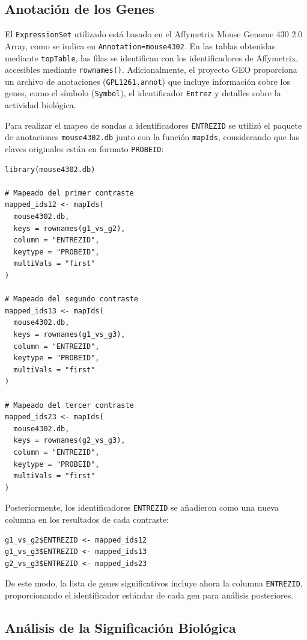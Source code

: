 \documentclass[12pt,a4paper]{article}
\begin{document}
\subsection{Anotación de los Genes}

El \texttt{ExpressionSet} utilizado está basado en el Affymetrix Mouse Genome 430 2.0 Array, como se indica en \texttt{Annotation=mouse4302}. En las tablas obtenidas mediante \texttt{topTable}, las filas se identifican con los identificadores de Affymetrix, accesibles mediante \texttt{rownames()}. Adicionalmente, el proyecto GEO proporciona un archivo de anotaciones (\texttt{GPL1261.annot}) que incluye información sobre los genes, como el símbolo (\texttt{Symbol}), el identificador \texttt{Entrez} y detalles sobre la actividad biológica.

Para realizar el mapeo de sondas a identificadores \texttt{ENTREZID} se utilizó el paquete de anotaciones \texttt{mouse4302.db} junto con la función \texttt{mapIds}, considerando que las claves originales están en formato \texttt{PROBEID}:

\begin{verbatim}
library(mouse4302.db)

# Mapeado del primer contraste
mapped_ids12 <- mapIds(
  mouse4302.db,
  keys = rownames(g1_vs_g2),
  column = "ENTREZID", 
  keytype = "PROBEID",
  multiVals = "first"
)

# Mapeado del segundo contraste
mapped_ids13 <- mapIds(
  mouse4302.db,
  keys = rownames(g1_vs_g3),
  column = "ENTREZID", 
  keytype = "PROBEID",
  multiVals = "first"
)

# Mapeado del tercer contraste
mapped_ids23 <- mapIds(
  mouse4302.db,
  keys = rownames(g2_vs_g3),
  column = "ENTREZID", 
  keytype = "PROBEID",
  multiVals = "first"
)
\end{verbatim}

Posteriormente, los identificadores \texttt{ENTREZID} se añadieron como una nueva columna en los resultados de cada contraste:

\begin{verbatim}
g1_vs_g2$ENTREZID <- mapped_ids12
g1_vs_g3$ENTREZID <- mapped_ids13
g2_vs_g3$ENTREZID <- mapped_ids23
\end{verbatim}

De este modo, la lista de genes significativos incluye ahora la columna \texttt{ENTREZID}, proporcionando el identificador estándar de cada gen para análisis posteriores.

\subsection{Análisis de la Significación Biológica}
\end{document}
